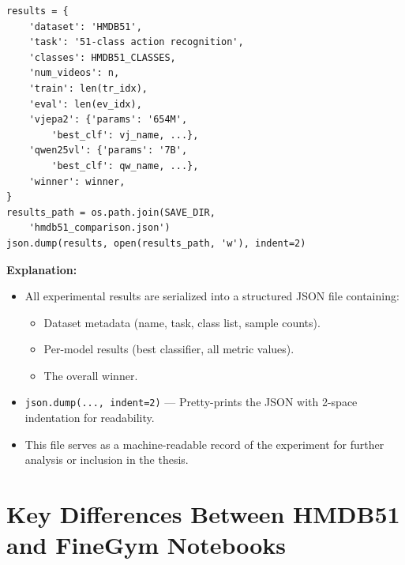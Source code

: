 \documentclass[a4paper, 12pt]{article}
\newenvironment{explanation}{%
  \par\smallskip
  \noindent\textcolor{blue!70!black}{\textbf{Explanation:}}\\
  \noindent
}{\par\medskip}
\begin{document}
\begin{lstlisting}
results = {
    'dataset': 'HMDB51',
    'task': '51-class action recognition',
    'classes': HMDB51_CLASSES,
    'num_videos': n,
    'train': len(tr_idx),
    'eval': len(ev_idx),
    'vjepa2': {'params': '654M',
        'best_clf': vj_name, ...},
    'qwen25vl': {'params': '7B',
        'best_clf': qw_name, ...},
    'winner': winner,
}
results_path = os.path.join(SAVE_DIR,
    'hmdb51_comparison.json')
json.dump(results, open(results_path, 'w'), indent=2)
\end{lstlisting}

\begin{explanation}
\begin{itemize}[nosep]
  \item All experimental results are serialized into a structured JSON file containing:
  \begin{itemize}[nosep]
    \item Dataset metadata (name, task, class list, sample counts).
    \item Per-model results (best classifier, all metric values).
    \item The overall winner.
  \end{itemize}
  \item \texttt{json.dump(..., indent=2)} --- Pretty-prints the JSON with 2-space indentation for readability.
  \item This file serves as a machine-readable record of the experiment for further analysis or inclusion in the thesis.
\end{itemize}
\end{explanation}

\newpage
\section{Key Differences Between HMDB51 and FineGym Notebooks}
\end{document}
